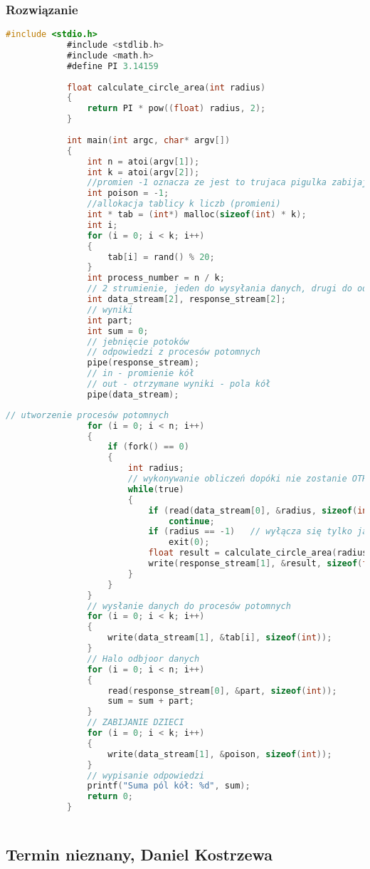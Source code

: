 		\subsubsection{Rozwiązanie}
			\begin{lstlisting}[language=C]
			#include <stdio.h>
			#include <stdlib.h>
			#include <math.h>
			#define PI 3.14159
			
			float calculate_circle_area(int radius)
			{
				return PI * pow((float) radius, 2);
			}
			
			int main(int argc, char* argv[])
			{
				int n = atoi(argv[1]);
				int k = atoi(argv[2]);
				//promien -1 oznacza ze jest to trujaca pigulka zabijajaca proces potomny
				int poison = -1;		
				//allokacja tablicy k liczb (promieni)
				int * tab = (int*) malloc(sizeof(int) * k);
				int i;
				for (i = 0; i < k; i++)
				{
					tab[i] = rand() % 20;
				}
				int process_number = n / k;
				// 2 strumienie, jeden do wysyłania danych, drugi do odbioru odpowiedzi
				int data_stream[2], response_stream[2];
				// wyniki
				int part;
				int sum = 0;
				// jebnięcie potoków
				// odpowiedzi z procesów potomnych
				pipe(response_stream);
				// in - promienie kół
				// out - otrzymane wyniki - pola kół
				pipe(data_stream);
			\end{lstlisting}
			\newpage
			\begin{lstlisting}[language=C]
				// utworzenie procesów potomnych
				for (i = 0; i < n; i++)
				{
					if (fork() == 0)
					{
						int radius;
						// wykonywanie obliczeń dopóki nie zostanie OTRUTY(!)
						while(true)
						{
							if (read(data_stream[0], &radius, sizeof(int)) != sizeof(int))
								continue;
							if (radius == -1)	// wyłącza się tylko jak otrzymamy pigułkę
								exit(0);
							float result = calculate_circle_area(radius);
							write(response_stream[1], &result, sizeof(float));
						}
					}
				}
				// wysłanie danych do procesów potomnych
				for (i = 0; i < k; i++)
				{
					write(data_stream[1], &tab[i], sizeof(int));
				}
				// Halo odbjoor danych
				for (i = 0; i < n; i++)
				{
					read(response_stream[0], &part, sizeof(int));
					sum = sum + part;
				}
				// ZABIJANIE DZIECI
				for (i = 0; i < k; i++)
				{
					write(data_stream[1], &poison, sizeof(int));
				}
				// wypisanie odpowiedzi
				printf("Suma pól kół: %d", sum);
				return 0;
			}
			
			\end{lstlisting}
		\newpage
	\subsection{Termin nieznany, Daniel Kostrzewa}
